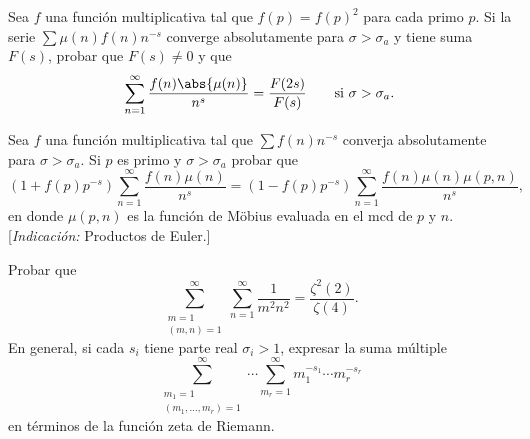 \documentclass[12pt,a4paper]{book}
\begin{document}
    \begin{ejercicio}
        Sea $f$ una función multiplicativa tal que $f(p)=f(p)^{2}$ para cada primo $p$. Si la
        serie $\sum\mu(n)f(n)n^{-s}$ converge absolutamente para $\sigma>\sigma_{a}$ y tiene
        suma $F(s)$, probar que $F(s)\neq0$ y que
        \begin{equation*}
            \sum_{n=1}^{\infty}\frac{f(n)\abs{\mu(n)}}{n^{s}}=\frac{F(2s)}{F(s)}\qquad\text{si }\sigma>\sigma_{a}.
        \end{equation*}
    \end{ejercicio}

    \begin{ejercicio}
        Sea $f$ una función multiplicativa tal que $\sum f(n)n^{-s}$ converja absolutamente
        para $\sigma>\sigma_{a}$. Si $p$ es primo y $\sigma>\sigma_{a}$ probar que
        \begin{equation*}
            (1+f(p)p^{-s})\sum_{n=1}^{\infty}\frac{f(n)\mu(n)}{n^{s}}=(1-f(p)p^{-s})\sum_{n=1}^{\infty}\frac{f(n)\mu(n)\mu(p,n)}{n^{s}},
        \end{equation*}
        en donde $\mu(p,n)$ es la función de Möbius evaluada en el mcd de $p$ y $n$.
        [\textit{Indicación:} Productos de Euler.]
    \end{ejercicio}

    \begin{ejercicio}
        Probar que
        \begin{equation*}
            \sum_{\substack{m=1\\(m,n)=1}}^{\infty}\sum_{n=1}^{\infty}\frac{1}{m^{2}n^{2}}=\frac{\zeta^{2}(2)}{\zeta(4)}.
        \end{equation*}
        En general, si cada $s_{i}$ tiene parte real $\sigma_{i}>1$, expresar la suma múltiple
        \begin{equation*}
            \sum_{\substack{m_{1}=1\\(m_{1},\dots,m_{r})=1}}^{\infty}\cdots\sum_{m_{r}=1}^{\infty}m_{1}^{-s_{1}}\cdots m_{r}^{-s_{r}}
        \end{equation*}
        en términos de la función zeta de Riemann.
    \end{ejercicio}
\end{document}

